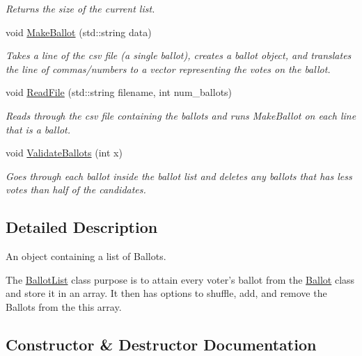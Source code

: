 \begin{DoxyCompactItemize}
\begin{DoxyCompactList}\small\item\em Returns the size of the current list. \end{DoxyCompactList}\item 
void \hyperlink{class_ballot_list_a928e7b3bbe5ae7607944e58ce84d35e7}{Make\+Ballot} (std\+::string data)
\begin{DoxyCompactList}\small\item\em Takes a line of the csv file (a single ballot), creates a ballot object, and translates the line of commas/numbers to a vector representing the votes on the ballot. \end{DoxyCompactList}\item 
void \hyperlink{class_ballot_list_a144f4d103b5fca451e2917656414951d}{Read\+File} (std\+::string filename, int num\+\_\+ballots)
\begin{DoxyCompactList}\small\item\em Reads through the csv file containing the ballots and runs Make\+Ballot on each line that is a ballot. \end{DoxyCompactList}\item 
void \hyperlink{class_ballot_list_a95412a76c48650f6cecbf07e6ba4fc62}{Validate\+Ballots} (int x)
\begin{DoxyCompactList}\small\item\em Goes through each ballot inside the ballot list and deletes any ballots that has less votes than half of the candidates. \end{DoxyCompactList}\end{DoxyCompactItemize}


\subsection{Detailed Description}
An object containing a list of Ballots. 

The \hyperlink{class_ballot_list}{Ballot\+List} class purpose is to attain every voter’s ballot from the \hyperlink{class_ballot}{Ballot} class and store it in an array. It then has options to shuffle, add, and remove the Ballots from the this array. 

\subsection{Constructor \& Destructor Documentation}
